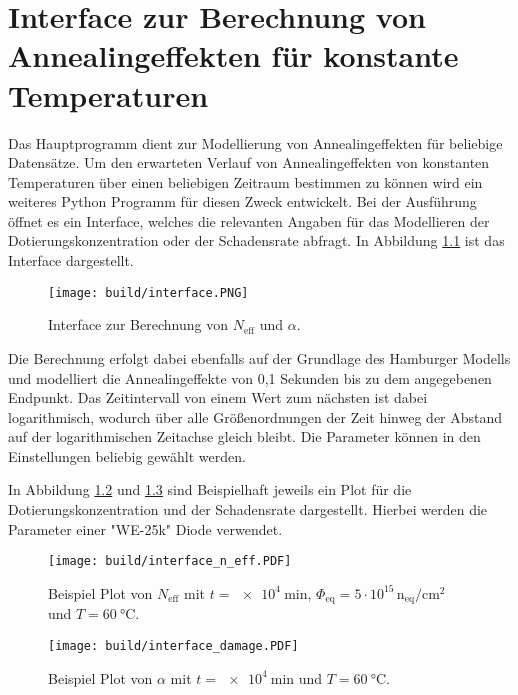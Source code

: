 \chapter{Interface zur Berechnung von Annealingeffekten für konstante Temperaturen}
Das Hauptprogramm dient zur Modellierung von Annealingeffekten für beliebige Datensätze.
Um den erwarteten Verlauf von Annealingeffekten von konstanten Temperaturen über einen
beliebigen Zeitraum bestimmen zu können wird ein weiteres Python Programm für diesen Zweck entwickelt.
Bei der Ausführung öffnet es ein Interface, welches die relevanten Angaben für
das Modellieren der Dotierungskonzentration oder der Schadensrate abfragt. In Abbildung \ref{fig:interface}
ist das Interface dargestellt.

\begin{figure}
    \texttt{[image: build/interface.PNG]}
\caption{Interface zur Berechnung von $N_{\mathrm{eff}}$ und $\alpha$.}
\label{fig:interface}
\end{figure}

Die Berechnung erfolgt dabei ebenfalls auf der Grundlage des Hamburger Modells und modelliert die
Annealingeffekte von
0,1 Sekunden bis zu dem angegebenen Endpunkt.
Das Zeitintervall von einem Wert zum nächsten ist dabei logarithmisch, wodurch über alle
Größenordnungen der Zeit hinweg der Abstand auf der logarithmischen Zeitachse gleich bleibt.
Die Parameter können in den Einstellungen beliebig gewählt werden.

In Abbildung \ref{fig:inter_n} und \ref{fig:inter_damage} sind Beispielhaft jeweils ein Plot für die Dotierungskonzentration und der
Schadensrate dargestellt. Hierbei werden die Parameter einer "WE-25k" Diode verwendet.


\begin{figure}
  \texttt{[image: build/interface\_n\_eff.PDF]}
  \caption{Beispiel Plot von $N_{\mathrm{eff}}$ mit $t = \SI{e4}{\minute}$, $\Phi_{\mathrm{eq}}= 5\cdot 10^{15} \, \mathrm{n_{eq}/cm^2}$ und $T=\SI{60}{\celsius}$.}
  \label{fig:inter_n}
\end{figure}

\begin{figure}
  \texttt{[image: build/interface\_damage.PDF]}
  \caption{Beispiel Plot von $\alpha$ mit $t = \SI{e4}{\minute}$ und $T=\SI{60}{\celsius}$.}
  \label{fig:inter_damage}
\end{figure}
